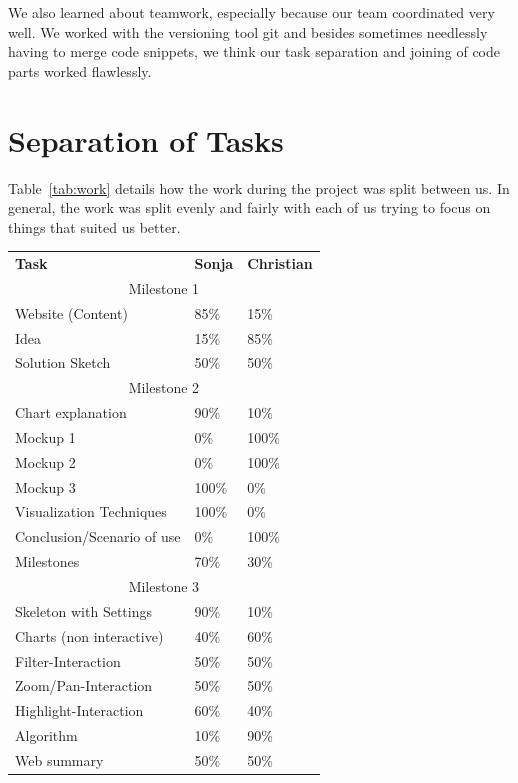 \documentclass{vgtc} %
\begin{document}
We also learned about teamwork, especially because our team coordinated very
well. We worked with the versioning tool git and besides sometimes needlessly
having to merge code snippets, we think our task separation and joining of code
parts worked flawlessly.

\section{Separation of Tasks}

Table~\ref{tab:work} details how the work during the project was split between
us. In general, the work was split evenly and fairly with each of us trying to
focus on things that suited us better.

\begin{table}[t]
    \centering
    \begin{tabular}{@{} p{4cm}p{1cm}p{1cm} @{}}
        \textbf{Task} & \textbf{Sonja} & \textbf{Christian} \\
        \multicolumn{3}{c}{\cellcolor[HTML]{EFEFEF}Milestone 1}\\
        Website (Content) & 85\% & 15\%\\
        Idea & 15\% & 85\%\\
        Solution Sketch & 50\% & 50\% \\

        \multicolumn{3}{c}{\cellcolor[HTML]{EFEFEF}Milestone 2}\\

        Chart explanation & 90\% & 10\%\\
        Mockup 1 & 0\% & 100\%\\
        Mockup 2 & 0\% & 100\%\\
        Mockup 3 & 100\% & 0\%\\
        Visualization Techniques & 100\% & 0\%\\
        Conclusion/Scenario of use & 0\% & 100\%\\
        Milestones & 70\% & 30\% \\

        \multicolumn{3}{c}{\cellcolor[HTML]{EFEFEF}Milestone 3}\\

        Skeleton with Settings & 90\% & 10\%\\
        Charts (non interactive) & 40\% &  60\%\\
        Filter-Interaction & 50\% & 50\%\\
        Zoom/Pan-Interaction & 50\% & 50\%\\
        Highlight-Interaction & 60\% & 40\%\\
        Algorithm & 10\% & 90\%\\
        Web summary & 50\% & 50\% \\


\end{tabular}
\end{table}
\end{document}
